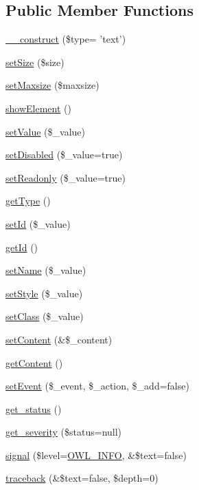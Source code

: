 \subsection*{Public Member Functions}
\begin{DoxyCompactItemize}
\item 
\hyperlink{classFormFieldTextPlugin_ac279106a485dfd0d9788e94df1ec24ab}{\_\-\_\-construct} (\$type= 'text')
\item 
\hyperlink{classFormFieldTextPlugin_af3867f1bd1b31695e66f73b8afadf7f6}{setSize} (\$size)
\item 
\hyperlink{classFormFieldTextPlugin_af6515309ad2c85640d0d15eebaf19a73}{setMaxsize} (\$maxsize)
\item 
\hyperlink{classFormFieldTextPlugin_ac6cee64e91f04b380e948973026bff4e}{showElement} ()
\item 
\hyperlink{classFormFieldPlugin_af951a690345b35e616d204cf51e8899e}{setValue} (\$\_\-value)
\item 
\hyperlink{classFormFieldPlugin_a91fae1af7cc850ae97f3f79652824b8c}{setDisabled} (\$\_\-value=true)
\item 
\hyperlink{classFormFieldPlugin_a866f1fd589c30d9e5bd1e059e4b85905}{setReadonly} (\$\_\-value=true)
\item 
\hyperlink{classFormFieldPlugin_af55e88f21054dfc3a0092c10ef0fbe40}{getType} ()
\item 
\hyperlink{classBaseElement_a0c1ce3d1684ecb78960cf7a97278494e}{setId} (\$\_\-value)
\item 
\hyperlink{classBaseElement_a4a7aa583ee21af392908d7fd42fde790}{getId} ()
\item 
\hyperlink{classBaseElement_a39bafb3609d10048920c20242c2a04c5}{setName} (\$\_\-value)
\item 
\hyperlink{classBaseElement_a6b2b9ff69f6e92db82f91d9c55cda697}{setStyle} (\$\_\-value)
\item 
\hyperlink{classBaseElement_af6597b30fa9798878f6290271043dfa2}{setClass} (\$\_\-value)
\item 
\hyperlink{classBaseElement_a164a9c6e4ee68afa0ad343942ba54d28}{setContent} (\&\$\_\-content)
\item 
\hyperlink{classBaseElement_af8c86b93bcdcfbc415bf96c622dc5516}{getContent} ()
\item 
\hyperlink{classBaseElement_ad5789f45f16aaa144716ee8558069c31}{setEvent} (\$\_\-event, \$\_\-action, \$\_\-add=false)
\item 
\hyperlink{class__OWL_a99ec771fa2c5c279f80152cc09e489a8}{get\_\-status} ()
\item 
\hyperlink{class__OWL_adf9509ef96858be7bdd9414c5ef129aa}{get\_\-severity} (\$status=null)
\item 
\hyperlink{class__OWL_a51ba4a16409acf2a2f61f286939091a5}{signal} (\$level=\hyperlink{owl_8severitycodes_8php_a139328861128689f2f4def6a399d9057}{OWL\_\-INFO}, \&\$text=false)
\item 
\hyperlink{class__OWL_aa29547995d6741b7d2b90c1d4ea99a13}{traceback} (\&\$text=false, \$depth=0)
\end{DoxyCompactItemize}
